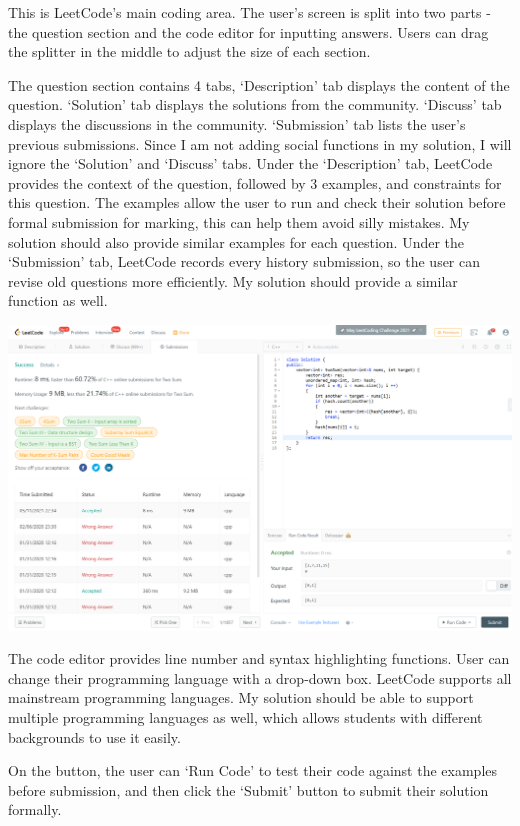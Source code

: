 \documentclass[a4paper]{report}
\begin{document}
This is LeetCode's main coding area. The user's screen is split into two parts - the question section and the code editor for inputting answers. Users can drag the splitter in the middle to adjust the size of each section.

The question section contains 4 tabs, `Description' tab displays the content of the question. `Solution' tab displays the solutions from the community. `Discuss' tab displays the discussions in the community. `Submission' tab lists the user's previous submissions. Since I am not adding social functions in my solution, I will ignore the `Solution' and `Discuss' tabs. Under the `Description' tab, LeetCode provides the context of the question, followed by 3 examples, and constraints for this question. The examples allow the user to run and check their solution before formal submission for marking, this can help them avoid silly mistakes. My solution should also provide similar examples for each question. Under the `Submission' tab, LeetCode records every history submission, so the user can revise old questions more efficiently. My solution should provide a similar function as well.

\includegraphics[width=\linewidth]{Two-Sum-LeetCode-Submission}

The code editor provides line number and syntax highlighting functions. User can change their programming language with a drop-down box. LeetCode supports all mainstream programming languages. My solution should be able to support multiple programming languages as well, which allows students with different backgrounds to use it easily.

On the button, the user can `Run Code' to test their code against the examples before submission, and then click the `Submit' button to submit their solution formally.
\end{document}
